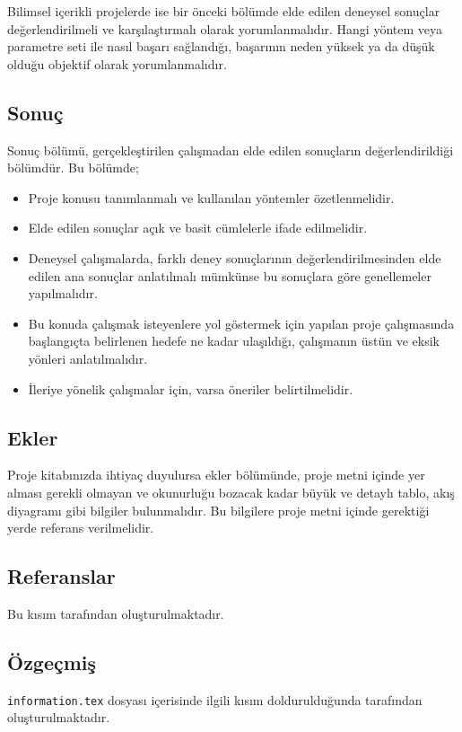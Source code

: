 Bilimsel içerikli projelerde ise bir önceki bölümde elde edilen deneysel sonuçlar değerlendirilmeli ve karşılaştırmalı olarak yorumlanmalıdır. Hangi yöntem veya parametre seti ile nasıl başarı sağlandığı, başarının neden yüksek ya da düşük olduğu objektif olarak yorumlanmalıdır.

\subsection{Sonuç}

Sonuç bölümü, gerçekleştirilen çalışmadan elde edilen sonuçların değerlendirildiği bölümdür. Bu bölümde;
\begin{itemize}
    \item Proje konusu tanımlanmalı ve kullanılan yöntemler özetlenmelidir.
    \item Elde edilen sonuçlar açık ve basit cümlelerle ifade edilmelidir.
    \item Deneysel çalışmalarda, farklı deney sonuçlarının değerlendirilmesinden elde edilen ana sonuçlar
    anlatılmalı mümkünse bu sonuçlara göre genellemeler yapılmalıdır.
    \item Bu konuda çalışmak isteyenlere yol göstermek için yapılan proje çalışmasında başlangıçta belirlenen
    hedefe ne kadar ulaşıldığı, çalışmanın üstün ve eksik yönleri anlatılmalıdır.
    \item İleriye yönelik çalışmalar için, varsa öneriler belirtilmelidir.
\end{itemize}

\subsection{Ekler}
Proje kitabınızda ihtiyaç duyulursa ekler bölümünde, proje metni içinde yer alması gerekli olmayan ve okunurluğu bozacak kadar büyük ve detaylı tablo, akış diyagramı gibi bilgiler bulunmalıdır. Bu bilgilere proje metni içinde gerektiği yerde referans verilmelidir.

\subsection{Referanslar}
Bu kısım \latex tarafından oluşturulmaktadır.

\subsection{Özgeçmiş}
\texttt{information.tex} dosyası içerisinde ilgili kısım doldurulduğunda \latex tarafından oluşturulmaktadır.

